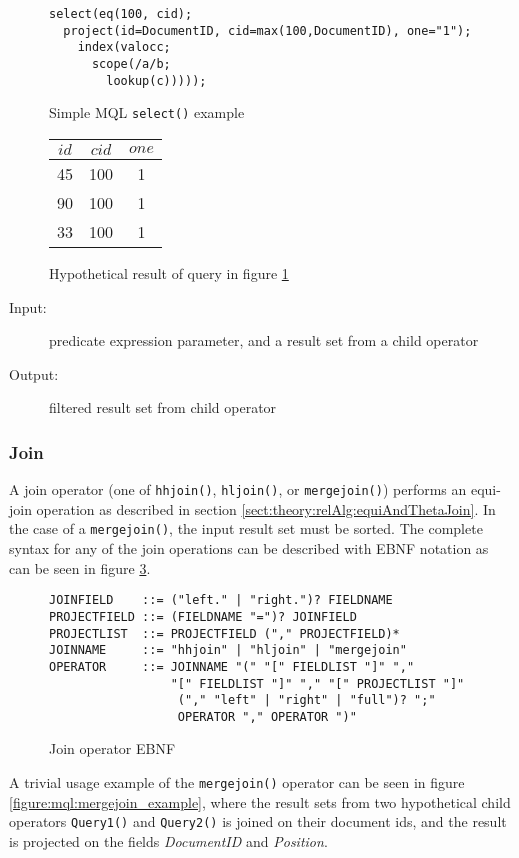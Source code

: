 \begin{figure}[!h]
\centering
\begin{Verbatim}
select(eq(100, cid);
  project(id=DocumentID, cid=max(100,DocumentID), one="1");
    index(valocc;
      scope(/a/b;
        lookup(c)))));
\end{Verbatim}
\caption{Simple MQL \texttt{select()} example}
\label{figure:mql:select_example}
\end{figure}

\begin{figure}[!h]
\centering
\begin{tabular}{|c | c | c |}
\hline
$id$ & $cid$ & $one$ \\ \hline
45 & 100 & 1 \\ \hline
90 & 100 & 1 \\ \hline
33 & 100 & 1 \\ \hline
\end{tabular}
\caption{Hypothetical result of query in figure
\ref{figure:mql:select_example}}
\label{figure:mql:select_example_result}
\end{figure}

\begin{description}
  \item[Input:] predicate expression parameter, and a result set from a child
operator
  \item[Output:] filtered result set from child operator 
\end{description}

\subsubsection{Join}
A join operator (one of \texttt{hhjoin()}, \texttt{hljoin()}, or
\texttt{mergejoin()}) performs an equi-join operation as described in section
\ref{sect:theory:relAlg:equiAndThetaJoin}. In the case of a
\texttt{mergejoin()}, the input result set must be sorted. The complete syntax
for any of the join operations can be described with EBNF notation as can be
seen in figure \ref{figure:mql:ebnf:join}.
\begin{figure}[!h]
\centering
\begin{Verbatim}
JOINFIELD    ::= ("left." | "right.")? FIELDNAME
PROJECTFIELD ::= (FIELDNAME "=")? JOINFIELD
PROJECTLIST  ::= PROJECTFIELD ("," PROJECTFIELD)*
JOINNAME     ::= "hhjoin" | "hljoin" | "mergejoin"
OPERATOR     ::= JOINNAME "(" "[" FIELDLIST "]" "," 
                 "[" FIELDLIST "]" "," "[" PROJECTLIST "]"
                  ("," "left" | "right" | "full")? ";"
                  OPERATOR "," OPERATOR ")"
\end{Verbatim}
\caption{Join operator EBNF}
\label{figure:mql:ebnf:join}
\end{figure}
A trivial usage example of the \texttt{mergejoin()} operator can be seen in
figure \ref{figure:mql:mergejoin_example}, where the result sets from two
hypothetical child operators \texttt{Query1()} and \texttt{Query2()} is joined
on their document ids, and the result is projected on the
fields \textit{DocumentID} and \textit{Position}.

